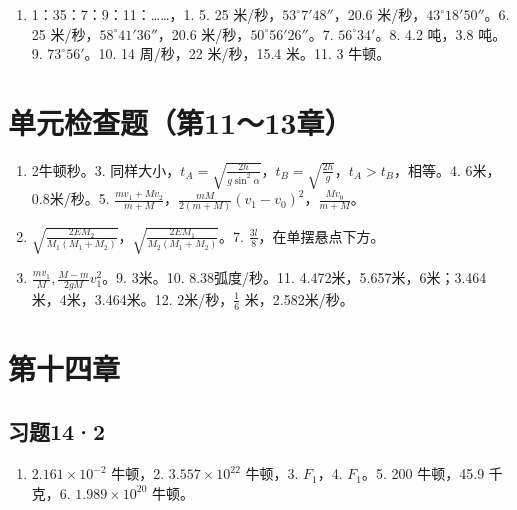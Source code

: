 \begin{enumerate}
\def\labelenumi{\arabic{enumi}.}
\setcounter{enumi}{1}
\tightlist
\item
  1：35：7：9：11：\ldots\ldots，1. 5. 25
  米/秒，\(53^{\circ}7'48''\)，20.6 米/秒，\(43^{\circ}18'50''\)。6. 25
  米/秒，\(58^{\circ}41'36''\)，20.6 米/秒，\(50^{\circ}56'26''\)。7.
  \(56^{\circ}34'\)。8. 4.2 吨，3.8 吨。9. \(73^{\circ}56'\)。10. 14
  周/秒，22 米/秒，15.4 米。11. 3 牛顿。
\end{enumerate}

\section{单元检查题（第11～13章）}\label{ux5355ux5143ux68c0ux67e5ux9898ux7b2c1113ux7ae0-1}

\begin{enumerate}
\def\labelenumi{\arabic{enumi}.}
\setcounter{enumi}{1}
\item
  2牛顿秒。3.
  同样大小，\(t_{A}=\sqrt{\frac{2h}{g\sin^{2}\alpha}}\)，\(t_{B}=\sqrt{\frac{2h}{g}}\)，\(t_{A}>t_{B}\)，相等。4.
  6米，0.8米/秒。5.
  \(\frac{mv_{1}+Mv_{2}}{m+M}\)，\(\frac{mM}{2(m+M)}(v_{1}-v_{0})^{2}\)，\(\frac{Mv_{0}}{m+M}\)。
\item
  \(\sqrt{\frac{2EM_2}{M_1(M_1 + M_2)}}\)，\(\sqrt{\frac{2EM_1}{M_2(M_1 + M_2)}}\)。7.
  \(\frac{3l}{8}\)，在单摆悬点下方。
\item
  \(\frac{mv_1}{M}, \frac{M - m}{2gM} v_1^2\)。9. 3米。10.
  8.38弧度/秒。11. 4.472米，5.657米，6米；3.464米，4米，3.464米。12.
  2米/秒，\(\frac{1}{6}\) 米，2.582米/秒。
\end{enumerate}

\section{第十四章}\label{ux7b2cux5341ux56dbux7ae0}

\subsection{习题14·2}\label{ux4e60ux9898142-1}

\begin{enumerate}
\def\labelenumi{\arabic{enumi}.}
\tightlist
\item
  \(2.161 \times 10^{-2}\) 牛顿，2. \(3.557 \times 10^{22}\) 牛顿，3.
  \(F_{1}\)，4. \(F_{1}\)。5. 200 牛顿，45.9 千克，6.
  \(1.989 \times 10^{20}\) 牛顿。
\end{enumerate}


